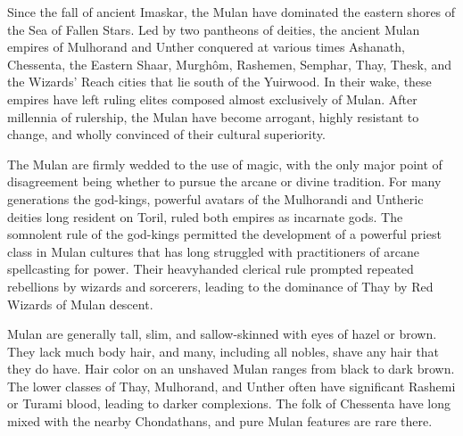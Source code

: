 
Since the fall of ancient Imaskar, the Mulan have dominated the eastern shores of the Sea of Fallen Stars. Led by two pantheons of deities, the ancient Mulan empires of Mulhorand and Unther conquered at various times Ashanath, Chessenta, the Eastern Shaar, Murghôm, Rashemen, Semphar, Thay, Thesk, and the Wizards’ Reach cities that lie south of the Yuirwood. In their wake, these empires have left ruling elites composed almost exclusively of Mulan. After millennia of rulership, the Mulan have become arrogant, highly resistant to change, and wholly convinced of their cultural superiority.

The Mulan are firmly wedded to the use of magic, with the only major point of disagreement being whether to pursue the arcane or divine tradition. For many generations the god-kings, powerful avatars of the Mulhorandi and Untheric deities long resident on Toril, ruled both empires as incarnate gods. The somnolent rule of the god-kings permitted the development of a powerful priest class in Mulan cultures that has long struggled with practitioners of arcane spellcasting for power. Their heavyhanded clerical rule prompted repeated rebellions by wizards and sorcerers, leading to the dominance of Thay by Red Wizards of Mulan descent.

Mulan are generally tall, slim, and sallow-skinned with eyes of hazel or brown. They lack much body hair, and many, including all nobles, shave any hair that they do have. Hair color on an unshaved Mulan ranges from black to dark brown. The lower classes of Thay, Mulhorand, and Unther often have significant Rashemi or Turami blood, leading to darker complexions. The folk of Chessenta have long mixed with the nearby Chondathans, and pure Mulan features are rare there.

